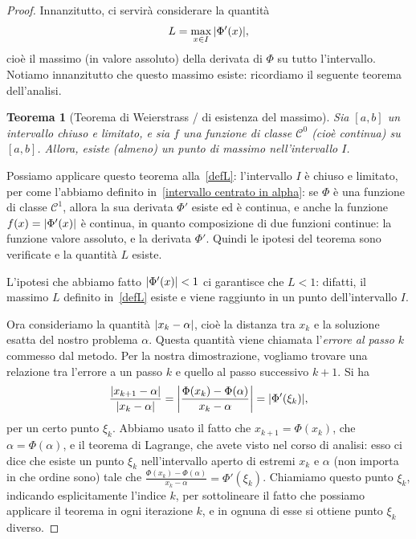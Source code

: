 \documentclass[a4paper]{report}
\DeclarePairedDelimiter{\abs}{\lvert}{\rvert}
\newtheorem{theorem}{Teorema}[chapter]
\theoremstyle{definition}
\theoremstyle{remark}
\begin{document}
\begin{proof}
Innanzitutto, ci servirà considerare la quantità
\begin{equation} \label{defL}
    L = \max_{x \in I} \, \abs{\Phi'(x)},    
\end{equation}
cioè il massimo (in valore assoluto) della derivata di $\Phi$ su tutto l'intervallo. Notiamo innanzitutto che questo massimo esiste: ricordiamo il seguente teorema dell'analisi.
\begin{theorem}[Teorema di Weierstrass / di esistenza del massimo]
    Sia $[a,b]$ un intervallo chiuso e limitato, e sia $f$ una funzione di classe $\mathcal{C}^0$ (cioè continua) su $[a,b]$. Allora, esiste (almeno) un punto di massimo nell'intervallo $I$.
\end{theorem}
Possiamo applicare questo teorema alla~\eqref{defL}: l'intervallo $I$ è chiuso e limitato, per come l'abbiamo definito in~\eqref{intervallo centrato in alpha}: se $\Phi$ è una funzione di classe $\mathcal{C}^1$, allora la sua derivata $\Phi'$ esiste ed è continua, e anche la funzione $f(x) = \abs{\Phi'(x)}$ è continua, in quanto composizione di due funzioni continue: la funzione valore assoluto, e la derivata $\Phi'$. Quindi le ipotesi del teorema sono verificate e la quantità $L$ esiste.

L'ipotesi che abbiamo fatto $\abs{\Phi'(x)} < 1$ ci garantisce che $L<1$: difatti, il massimo $L$ definito in~\eqref{defL} esiste e viene raggiunto in un punto dell'intervallo $I$.

Ora consideriamo la quantità $\abs{x_k-\alpha}$, cioè la distanza tra $x_k$ e la soluzione esatta del nostro problema $\alpha$. Questa quantità viene chiamata l'\emph{errore al passo $k$} commesso dal metodo. Per la nostra dimostrazione, vogliamo trovare una relazione tra l'errore a un passo $k$ e quello al passo successivo $k+1$. Si ha
\begin{equation} \label{riduzione errore punto fisso}
\frac{\abs{x_{k+1}-\alpha}}{\abs{x_k-\alpha}} = \abs*{
    \frac{\Phi(x_k)-\Phi(\alpha)}{x_k-\alpha}} = \abs{\Phi'(\xi_k)},
\end{equation}
per un certo punto $\xi_k$. Abbiamo usato il fatto che $x_{k+1} = \Phi(x_k)$, che $\alpha = \Phi(\alpha)$, e il teorema di Lagrange, che avete visto nel corso di analisi: esso ci dice che esiste un punto $\xi_k$ nell'intervallo aperto di estremi $x_k$ e $\alpha$ (non importa in che ordine sono) tale che $\frac{\Phi(x_k)-\Phi(\alpha)}{x_k-\alpha} = \Phi'(\xi_k)$. Chiamiamo questo punto $\xi_k$, indicando esplicitamente l'indice $k$, per sottolineare il fatto che possiamo applicare il teorema in ogni iterazione $k$, e in ognuna di esse si ottiene punto $\xi_k$ diverso.


\end{proof}
\end{document}
